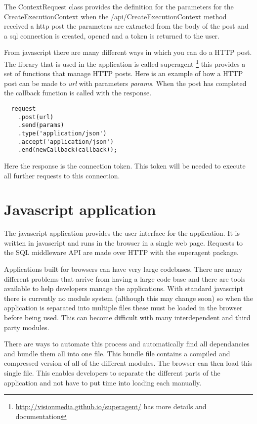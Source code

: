 The ContextRequest class provides the definition for the parameters for
the CreateExecutionContext when the /api/CreateExecutionContext method
received a http post the parameters are extracted from the body of the
post and a sql connection is created, opened and a token is returned to
the user.

From javascript there are many different ways in which you can do a HTTP post.
The library that is used in the application is called superagent
\footnote{\url{http://visionmedia.github.io/superagent/} has more details and
documentation} this provides a set of functions that manage HTTP posts. Here is
an example of how a HTTP post can be made to \emph{url} with parameters
\emph{params}. When the post has completed the callback function is called with
the response.

\begin{listing}[ht]
\begin{verbatim}
  request
    .post(url)
    .send(params)
    .type('application/json')
    .accept('application/json')
    .end(newCallback(callback));
\end{verbatim}
\end{listing}

Here the response is the connection token. This token will be needed to
execute all further requests to this connection.

\section{Javascript application}\label{javascript-application}

The javascript application provides the user interface for the
application. It is written in javascript and runs in the browser in a
single web page. Requests to the SQL middleware API are made over HTTP
with the superagent package.

Applications built for browsers can have very large codebases, There are many
different problems that arrive from having a large code base and there are tools
available to help developers manage the applications. With standard javascript
there is currently no module system (although this may change
soon\cite{javascriptes6}) so when the application is separated into multiple
files these must be loaded in the browser before being used. This can become
difficult with many interdependent and third party modules.

There are ways to automate this process and automatically find all dependancies
and bundle them all into one file. This bundle file contains a compiled and
compressed version of all of the different modules. The browser can then load
this single file. This enables developers to separate the different parts of the application and not have to
put time into loading each manually.

